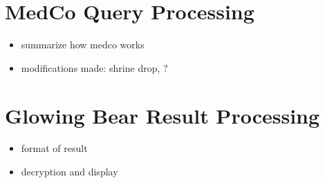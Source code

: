 \section{MedCo Query Processing}
\begin{itemize}
    \item summarize how medco works
    \item modifications made: shrine drop, ?
\end{itemize}


\section{Glowing Bear Result Processing}
\begin{itemize}
    \item format of result
    \item decryption and display
\end{itemize}
